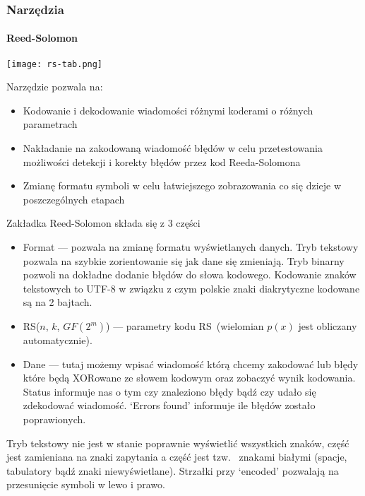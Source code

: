 \subsubsection{Narzędzia}
\paragraph{Reed-Solomon}
\begin{center}
    \texttt{[image: rs-tab.png]}
\end{center}
Narzędzie pozwala na:
\begin{itemize}
    \item Kodowanie i dekodowanie wiadomości różnymi koderami o różnych
    parametrach
    \item Nakładanie na zakodowaną wiadomość błędów w celu przetestowania
    możliwości detekcji i korekty błędów przez kod Reeda-Solomona
    \item Zmianę formatu symboli w celu łatwiejszego zobrazowania co się
    dzieje w poszczególnych etapach
\end{itemize}

Zakładka Reed-Solomon składa się z 3 części
\begin{itemize}
    \item Format --- pozwala na zmianę formatu wyświetlanych danych.
    Tryb tekstowy pozwala na szybkie zorientowanie się jak dane się
    zmieniają. Tryb binarny pozwoli na dokładne dodanie błędów do
    słowa kodowego. Kodowanie znaków tekstowych to UTF-8 w związku z
    czym polskie znaki diakrytyczne kodowane są na 2 bajtach.
    \item RS($n$, $k$, $GF(2^m)$) --- parametry kodu
    RS~(wielomian $p(x)$ jest obliczany automatycznie).
    \item Dane --- tutaj możemy wpisać wiadomość którą chcemy
    zakodować lub błędy które będą XORowane ze słowem kodowym oraz
    zobaczyć wynik kodowania. Status informuje nas o tym czy
    znaleziono błędy bądź czy udało się zdekodować wiadomość.
    `Errors found' informuje ile błędów zostało poprawionych.
\end{itemize}

Tryb tekstowy nie jest w stanie poprawnie wyświetlić wszystkich
znaków, część jest zamieniana na znaki zapytania a część jest tzw.
~znakami białymi (spacje, tabulatory bądź znaki niewyświetlane).
Strzałki przy `encoded' pozwalają na przesunięcie symboli w lewo i prawo.

